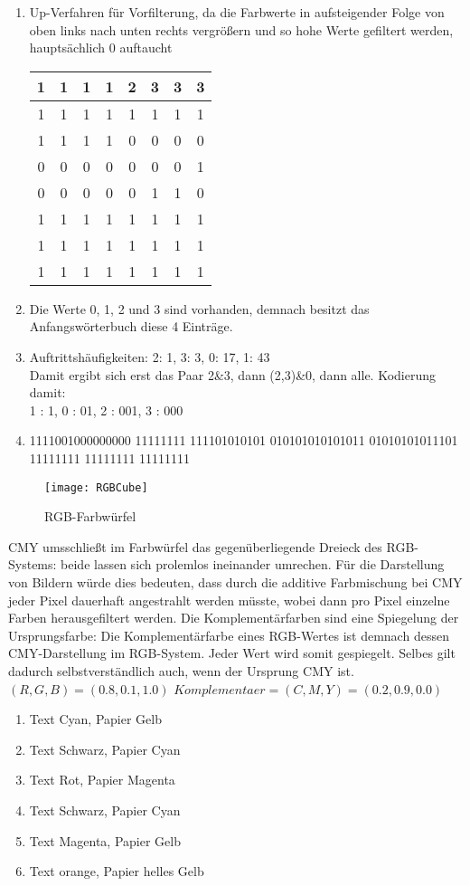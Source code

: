 \documentclass[a4paper,10pt]{article}
\begin{document}
\kopf
\renewcommand{\figurename}{Figure}

\begin{enumerate}
\item
Up-Verfahren für Vorfilterung, da die Farbwerte in aufsteigender Folge von oben links nach unten rechts vergrößern und so hohe Werte gefiltert werden, hauptsächlich 0 auftaucht \\
\begin{tabular}{|c|c|c|c|c|c|c|c|}
\hline
1&1&1&1&2&3&3&3 \\
\hline
1&1&1&1&1&1&1&1 \\
\hline
1&1&1&1&0&0&0&0 \\
\hline
0&0&0&0&0&0&0&1 \\
\hline
0&0&0&0&0&1&1&0 \\
\hline
1&1&1&1&1&1&1&1 \\
\hline
1&1&1&1&1&1&1&1 \\
\hline
1&1&1&1&1&1&1&1 \\
\hline
\end{tabular}
\item Die Werte 0, 1, 2 und 3 sind vorhanden, demnach besitzt das Anfangswörterbuch diese 4 Einträge.
\item Auftrittshäufigkeiten:
2: 1, 3: 3, 0: 17, 1: 43 \\
Damit ergibt sich erst das Paar 2\&3, dann (2,3)\&0, dann alle. Kodierung damit: \\
1 : 1,
0 : 01,
2 : 001,
3 : 000
\item
1111001000000000 11111111 111101010101 010101010101011 01010101011101 11111111 11111111 11111111 
\end{enumerate}
\begin{figure}[hb]
\centering
\texttt{[image: RGBCube]}
\caption{RGB-Farbwürfel}
\end{figure}
CMY umsschließt im Farbwürfel das gegenüberliegende Dreieck des RGB-Systems: beide lassen sich prolemlos ineinander umrechen. 
Für die Darstellung von Bildern würde dies bedeuten, dass durch die additive Farbmischung bei CMY jeder Pixel dauerhaft angestrahlt werden müsste, wobei dann pro Pixel einzelne Farben herausgefiltert werden.
Die Komplementärfarben sind eine Spiegelung der Ursprungsfarbe: Die Komplementärfarbe eines RGB-Wertes ist demnach dessen CMY-Darstellung im RGB-System. Jeder Wert wird somit gespiegelt. Selbes gilt dadurch selbstverständlich auch, wenn der Ursprung CMY ist.\\
$(R,G,B) = (0.8,0.1,1.0)$   $Komplementaer = (C,M,Y) = (0.2,0.9,0.0)$
\begin{enumerate}
\item Text Cyan, Papier Gelb
\item Text Schwarz, Papier Cyan
\item Text Rot, Papier Magenta
\item Text Schwarz, Papier Cyan
\item Text Magenta, Papier Gelb
\item Text orange, Papier helles Gelb
\end{enumerate}
\end{document}
